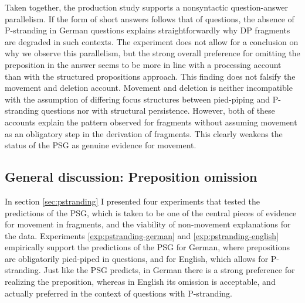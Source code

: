 Taken together, the production study supports a nonsyntactic question-an\-swer parallelism. If the form of short answers follows that of questions, the absence of P-stranding in German questions explains straightforwardly why DP fragments are degraded in such contexts. The experiment does not allow for a conclusion on why we observe this parallelism, but the strong overall preference for omitting the preposition in the answer seems to be more in line with a processing account than with the structured propositions approach. This finding does not falsify the movement and deletion account. Movement and deletion is neither incompatible with the assumption of differing focus structures between pied-piping and P-stranding questions nor with structural persistence. However, both of these accounts explain the pattern observed for fragments without assuming movement as an obligatory step in the derivation of fragments. This clearly weakens the status of the PSG as genuine evidence for movement.

\subsection{General discussion: Preposition omission} \label{sec:pstranding-discussion}
In section \ref{sec:pstranding} I presented four experiments that tested the predictions of the PSG, which is taken to be one of the central pieces of evidence for movement in fragments, and the viability of non-movement explanations for the data. Experiments \ref{exp:pstranding-german} and \ref{exp:pstranding-english} empirically support the predictions of the PSG for German, where prepositions are obligatorily pied-piped in questions, and for English, which allows for P-stranding. Just like the PSG predicts, in German there is a strong preference for realizing the preposition, whereas in English its omission is acceptable, and actually preferred in the context of questions with P-stranding.

